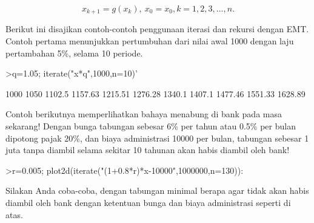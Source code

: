 \documentclass[a4paper,10pt]{article}
\begin{document}
\begin{eulernotebook}
\begin{eulercomment}
\begin{eulercomment}
\begin{eulercomment}
\end{eulercomment}
\begin{eulerformula}
\[
x_{k+1}=g(x_k), \ x_0=x_0, k= 1, 2, 3, ..., n.
\]
\end{eulerformula}
\begin{eulercomment}
Berikut ini disajikan contoh-contoh penggunaan iterasi dan rekursi dengan EMT. Contoh
pertama menunjukkan pertumbuhan dari nilai awal 1000 dengan laju pertambahan 5\%, selama 10
periode.
\end{eulercomment}
\begin{eulerprompt}
>q=1.05; iterate("x*q",1000,n=10)'
\end{eulerprompt}
\begin{euleroutput}
           1000 
           1050 
         1102.5 
        1157.63 
        1215.51 
        1276.28 
         1340.1 
         1407.1 
        1477.46 
        1551.33 
        1628.89 
\end{euleroutput}
\begin{eulercomment}
Contoh berikutnya memperlihatkan bahaya menabung di bank pada masa sekarang! Dengan bunga
tabungan sebesar 6\% per tahun atau 0.5\% per bulan dipotong pajak 20\%, dan biaya administrasi
10000 per bulan, tabungan sebesar 1 juta tanpa diambil selama sekitar 10 tahunan akan habis
diambil oleh bank!
\end{eulercomment}
\begin{eulerprompt}
>r=0.005; plot2d(iterate("(1+0.8*r)*x-10000",1000000,n=130)):
\end{eulerprompt}
\begin{eulercomment}
Silakan Anda coba-coba, dengan tabungan minimal berapa agar tidak akan habis diambil oleh
bank dengan ketentuan bunga dan biaya administrasi seperti di atas.


\end{eulercomment}
\end{eulercomment}
\end{eulercomment}
\end{eulernotebook}
\end{document}
